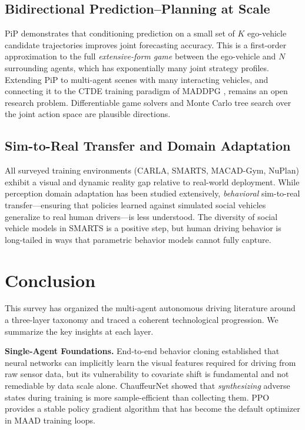 \documentclass[12pt, a4paper]{article}
\begin{document}
\subsection{Bidirectional Prediction--Planning at Scale}
\label{sec:gametheory}

PiP \citep{song2020pip} demonstrates that conditioning prediction on a small set
of $K$ ego-vehicle candidate trajectories improves joint forecasting accuracy. This
is a first-order approximation to the full \emph{extensive-form game} between the
ego-vehicle and $N$ surrounding agents, which has exponentially many joint
strategy profiles. Extending PiP to multi-agent scenes with many interacting
vehicles, and connecting it to the CTDE training paradigm of MADDPG
\citep{lowe2017multi}, remains an open research problem. Differentiable game
solvers and Monte Carlo tree search over the joint action space are plausible
directions.

\subsection{Sim-to-Real Transfer and Domain Adaptation}
\label{sec:simreal}

All surveyed training environments (CARLA, SMARTS, MACAD-Gym, NuPlan) exhibit a
visual and dynamic reality gap relative to real-world deployment. While perception
domain adaptation has been studied extensively, \emph{behavioral} sim-to-real
transfer---ensuring that policies learned against simulated social vehicles generalize
to real human drivers---is less understood. The diversity of social vehicle models in
SMARTS \citep{zhou2020smarts} is a positive step, but human driving behavior is
long-tailed in ways that parametric behavior models cannot fully capture.

\section{Conclusion}
\label{sec:conclusion}

This survey has organized the multi-agent autonomous driving literature around a
three-layer taxonomy and traced a coherent technological progression. We summarize
the key insights at each layer.

\textbf{Single-Agent Foundations.}
End-to-end behavior cloning \citep{bojarski2016end} established that neural
networks can implicitly learn the visual features required for driving from raw
sensor data, but its vulnerability to covariate shift is fundamental and not
remediable by data scale alone. ChauffeurNet \citep{bansal2018chauffeur} showed
that \emph{synthesizing} adverse states during training is more sample-efficient
than collecting them. PPO \citep{schulman2017proximal} provides a stable policy
gradient algorithm that has become the default optimizer in MAAD training loops.
\end{document}
